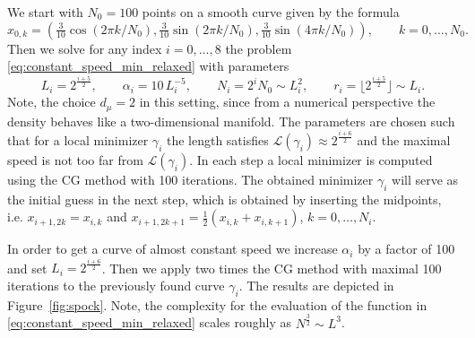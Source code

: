 \documentclass[draft,
a4paper,11pt,DIV=11,%
abstract=on%
]{scrartcl}
\begin{document}
We start with $N_{0}=100$ points on a smooth curve given by the formula
\[
  x_{0,k} =  ( \tfrac{3}{10} \cos(2\pi k/N_{0}), \tfrac{3}{10} \sin(2\pi k/N_{0}), \tfrac{3}{10} \sin(4\pi k/N_{0})), \qquad k=0,\dots,N_{0}.
\]
Then we solve for any index $i=0,\dots,8$ the problem \eqref{eq:constant_speed_min_relaxed} with parameters
\[
  L_{i} = 2^{\frac{i+5}{2}},\qquad \alpha_{i} = 10\,L_{i}^{-5},\qquad N_{i} = 2^{i} N_{0} \sim L_{i}^{2}, \qquad r_{i}= \lfloor 2^{\frac{i+5}{2}} \rfloor \sim L_{i}.
\]
Note, the choice $d_{\mu}=2$ in this setting, since from a numerical perspective the density behaves like a two-dimensional manifold. 
The parameters are chosen such that
for a local minimizer $\gamma_{i}$ the length satisfies $\mathcal L(\gamma_{i}) \approx 2^{\frac{i+6}{2}}$ and the maximal speed is not too far from $\mathcal L(\gamma_{i})$. In each step a local minimizer is computed using the CG method with 100 iterations. The obtained minimizer $\gamma_{i}$ will serve as the initial guess in the next step, which is obtained by inserting the midpoints, i.e. $x_{i+1,2k}=x_{i,k}$ and $x_{i+1,2k+1} = \frac{1}{2}(x_{i,k}+ x_{i,k+1})$, $k=0,\dots,N_{i}$.

In order to get a curve of almost constant speed we increase $\alpha_{i}$ by a factor of 100 and set $L_{i} = 2^{\frac{i+6}{2}}$. Then we apply two times the CG method with maximal 100 iterations to the previously found curve $\gamma_{i}$. The results are depicted in Figure~\ref{fig:spock}.  Note, the complexity for the evaluation of the function in \eqref{eq:constant_speed_min_relaxed} scales roughly as $N^{\frac{3}{2}} \sim L^{3}$.
\end{document}
